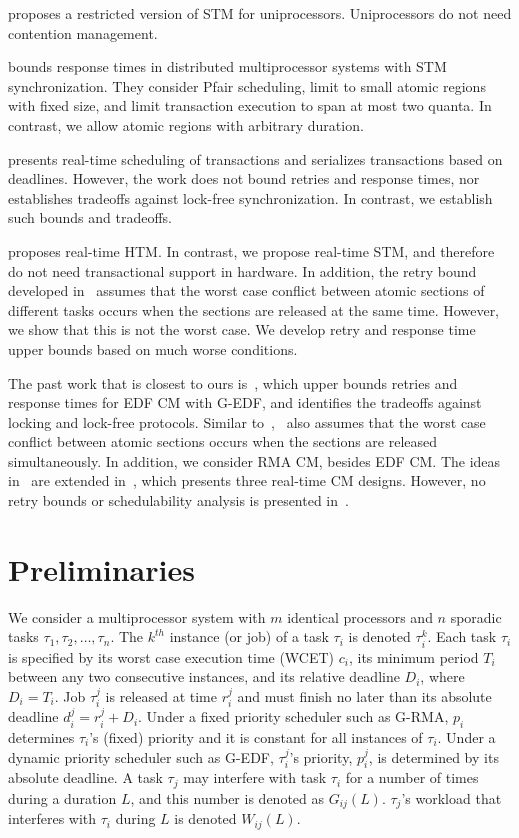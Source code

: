 \documentclass[letter]{sig-alternate}
\begin{document}
\cite{manson2006preemptible} proposes a restricted version of STM for uniprocessors. Uniprocessors do not need contention management.

\cite{fahmy2009bounding} bounds response times in distributed multiprocessor systems with STM synchronization. They consider Pfair scheduling, limit to small atomic regions with fixed size, and limit transaction execution to span at most two quanta. In contrast, we allow atomic regions with  arbitrary duration. 

\cite{sarni2009real} presents real-time scheduling of transactions and serializes transactions based on deadlines. However, the work does not bound retries and response times, nor establishes  tradeoffs against lock-free synchronization. In contrast, we establish such bounds and tradeoffs.


\cite{schoeberl2010rttm} proposes real-time HTM. In contrast, we propose real-time STM, and therefore do not need transactional support in hardware. In addition, the retry bound developed in~\cite{schoeberl2010rttm} assumes that the worst case conflict between atomic sections of different tasks occurs when the sections are released at the same time. However, we show that this is not the worst case. We develop retry and response time upper bounds based on much worse conditions.


The past work that is closest to ours is~\cite{key-1}, which upper bounds retries and response times for  EDF CM with G-EDF, and identifies the tradeoffs against locking and lock-free protocols. Similar to~\cite{schoeberl2010rttm},~\cite{key-1} also assumes that the worst case conflict between atomic sections occurs when the sections are released simultaneously. 
In addition, we consider RMA CM, besides EDF CM. The ideas in~\cite{key-1} are extended in~\cite{barrosmanaging}, which presents three real-time CM designs. However, no retry bounds or schedulability analysis is presented  in~\cite{barrosmanaging}. 


\section{Preliminaries}
\label{sec:model}

We consider a multiprocessor system with $m$ identical processors and $n$ sporadic tasks $\tau_1, \tau_2,\ldots, \tau_n$. The $k^{th}$ instance (or job) of a task $\tau_i$ is denoted $\tau_i^k$. Each task $\tau_i$ is specified by its worst case execution time (WCET) $c_i$, its minimum period $T_i$ between any two consecutive instances, and its relative deadline $D_i$, where $D_i=T_i$. Job $\tau_i^j$ is released at time $r_i^j$ and must finish no later than its absolute deadline $d_i^j=r_i^j+D_i$. Under a fixed priority scheduler such as G-RMA, $p_i$ determines $\tau_i$'s (fixed) priority and it is constant for all instances of $\tau_i$. Under a dynamic priority scheduler such as G-EDF, $\tau_i^j$'s priority, $p_i^j$, is determined by its absolute deadline. 
A task $\tau_j$ may interfere with task $\tau_i$ for a number of times during a duration $L$, and this number is denoted as $G_{ij}(L)$. 
$\tau_j$'s workload that interferes with $\tau_i$ during $L$ is denoted $W_{ij}(L)$.
\end{document}

